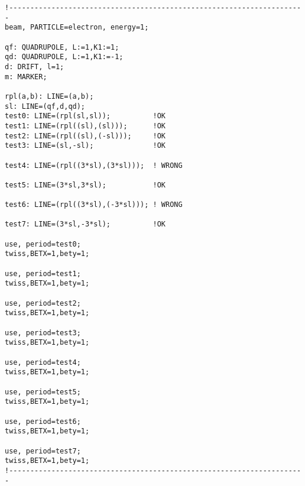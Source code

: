 \begin{verbatim}
!----------------------------------------------------------------------
beam, PARTICLE=electron, energy=1;

qf: QUADRUPOLE, L:=1,K1:=1;
qd: QUADRUPOLE, L:=1,K1:=-1;
d: DRIFT, l=1;
m: MARKER;

rpl(a,b): LINE=(a,b);
sl: LINE=(qf,d,qd);
test0: LINE=(rpl(sl,sl));          !OK 
test1: LINE=(rpl((sl),(sl)));      !OK
test2: LINE=(rpl((sl),(-sl)));     !OK
test3: LINE=(sl,-sl);              !OK

test4: LINE=(rpl((3*sl),(3*sl)));  ! WRONG

test5: LINE=(3*sl,3*sl);           !OK

test6: LINE=(rpl((3*sl),(-3*sl))); ! WRONG

test7: LINE=(3*sl,-3*sl);          !OK

use, period=test0;
twiss,BETX=1,bety=1;

use, period=test1;
twiss,BETX=1,bety=1;

use, period=test2;
twiss,BETX=1,bety=1;

use, period=test3;
twiss,BETX=1,bety=1;

use, period=test4;
twiss,BETX=1,bety=1;

use, period=test5;
twiss,BETX=1,bety=1;

use, period=test6;
twiss,BETX=1,bety=1;

use, period=test7;
twiss,BETX=1,bety=1;
!----------------------------------------------------------------------
\end{verbatim}


